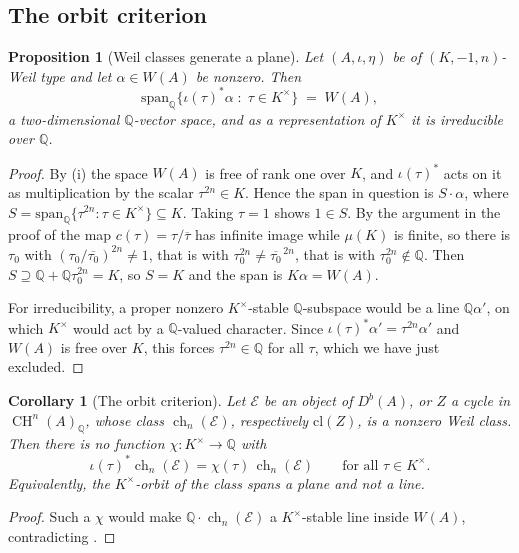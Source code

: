 \documentclass[11pt,reqno]{amsart}
\theoremstyle{plain}
\newtheorem{proposition}[theorem]{Proposition}
\newtheorem{corollary}[theorem]{Corollary}
\theoremstyle{definition}
\theoremstyle{remark}
\newcommand{\QQ}{\mathbb{Q}}
\newcommand{\cE}{\mathcal{E}}
\newcommand{\HW}{W}                      %
\newcommand{\cl}{\mathrm{cl}}
\DeclareMathOperator{\CH}{CH}
\DeclareMathOperator{\ch}{ch}
\newcommand{\Kx}{K^{\times}}
\newcommand{\bbar}[1]{\overline{#1}}
\begin{document}
\subsection{The orbit criterion}

\begin{proposition}[Weil classes generate a plane]\label{prop:orbitplane}
Let $(A,\iota,\eta)$ be of $(K,-1,n)$-Weil type and let $\alpha\in\HW(A)$ be
nonzero. Then
\[
  \mathrm{span}_{\QQ}\bigl\{\iota(\tau)^{*}\alpha\;:\;\tau\in\Kx\bigr\}
  \;=\;\HW(A),
\]
a two-dimensional $\QQ$-vector space, and as a representation of $\Kx$ it is
irreducible over $\QQ$.
\end{proposition}

\begin{proof}
By (i) the space $\HW(A)$ is free of rank one over $K$, and
$\iota(\tau)^{*}$ acts on it as multiplication by the scalar $\tau^{2n}\in K$.
Hence the span in question is $S\cdot\alpha$, where
$S=\mathrm{span}_{\QQ}\{\tau^{2n}:\tau\in\Kx\}\subseteq K$. Taking $\tau=1$
shows $1\in S$. By the argument in the proof of  the map
$c(\tau)=\tau/\bbar{\tau}$ has infinite image while $\mu(K)$ is finite, so there
is $\tau_{0}$ with $(\tau_{0}/\bbar{\tau_{0}})^{2n}\ne1$, that is with
$\tau_{0}^{2n}\ne\bbar{\tau_{0}}^{\,2n}$, that is with $\tau_{0}^{2n}\notin\QQ$.
Then $S\supseteq\QQ+\QQ\tau_{0}^{2n}=K$, so $S=K$ and the span is
$K\alpha=\HW(A)$.

For irreducibility, a proper nonzero $\Kx$-stable $\QQ$-subspace would be a
line $\QQ\alpha'$, on which $\Kx$ would act by a $\QQ$-valued character. Since
$\iota(\tau)^{*}\alpha'=\tau^{2n}\alpha'$ and $\HW(A)$ is free over $K$, this forces
$\tau^{2n}\in\QQ$ for all $\tau$, which we have just excluded.
\end{proof}

\begin{corollary}[The orbit criterion]\label{cor:orbitcriterion}
Let $\cE$ be an object of $D^{b}(A)$, or $Z$ a cycle in $\CH^{n}(A)_{\QQ}$,
whose class $\ch_{n}(\cE)$, respectively $\cl(Z)$, is a nonzero Weil class.
Then there is no function $\chi\colon\Kx\to\QQ$ with
\[
  \iota(\tau)^{*}\ch_{n}(\cE)=\chi(\tau)\,\ch_{n}(\cE)
  \qquad\text{for all }\tau\in\Kx .
\]
Equivalently, the $\Kx$-orbit of the class spans a plane and not a line.
\end{corollary}

\begin{proof}
Such a $\chi$ would make $\QQ\cdot\ch_{n}(\cE)$ a $\Kx$-stable line inside
$\HW(A)$, contradicting .
\end{proof}
\end{document}
